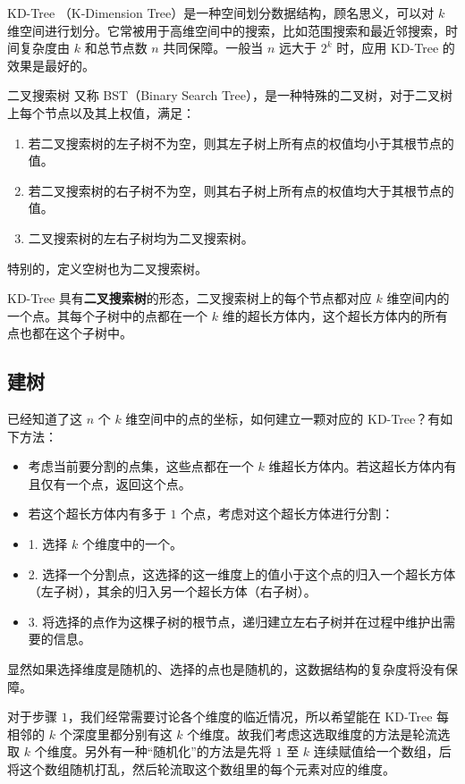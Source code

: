 
KD-Tree （K-Dimension Tree）是一种空间划分数据结构，顾名思义，可以对 $k$ 维空间进行划分。它常被用于高维空间中的搜索，比如范围搜索和最近邻搜索，时间复杂度由 $k$ 和总节点数 $n$ 共同保障。一般当 $n$ 远大于 $2^k$ 时，应用 KD-Tree 的效果是最好的。

\begin{definition}{二叉搜索树}
又称 BST（Binary Search Tree），是一种特殊的二叉树，对于二叉树上每个节点以及其上权值，满足：
\begin{enumerate}
\item 若二叉搜索树的左子树不为空，则其左子树上所有点的权值均小于其根节点的值。
\item 若二叉搜索树的右子树不为空，则其右子树上所有点的权值均大于其根节点的值。
\item 二叉搜索树的左右子树均为二叉搜索树。
\end{enumerate}
特别的，定义空树也为二叉搜索树。
\end{definition}

KD-Tree 具有\textbf{二叉搜索树}的形态，二叉搜索树上的每个节点都对应 $k$ 维空间内的一个点。其每个子树中的点都在一个 $k$ 维的超长方体内，这个超长方体内的所有点也都在这个子树中。

\subsection{建树}

已经知道了这 $n$ 个 $k$ 维空间中的点的坐标，如何建立一颗对应的 KD-Tree？有如下方法：

\begin{itemize}
\item 考虑当前要分割的点集，这些点都在一个 $k$ 维超长方体内。若这超长方体内有且仅有一个点，返回这个点。
\item 若这个超长方体内有多于 $1$ 个点，考虑对这个超长方体进行分割：
\item 1. 选择 $k$ 个维度中的一个。
    \item 2. 选择一个分割点，这选择的这一维度上的值小于这个点的归入一个超长方体（左子树），其余的归入另一个超长方体（右子树）。
    \item 3. 将选择的点作为这棵子树的根节点，递归建立左右子树并在过程中维护出需要的信息。
\end{itemize}

显然如果选择维度是随机的、选择的点也是随机的，这数据结构的复杂度将没有保障。

对于步骤 $1$，我们经常需要讨论各个维度的临近情况，所以希望能在 KD-Tree 每相邻的 $k$ 个深度里都分别有这 $k$ 个维度。故我们考虑这选取维度的方法是轮流选取 $k$ 个维度。另外有一种“随机化”的方法是先将 $1$ 至 $k$ 连续赋值给一个数组，后将这个数组随机打乱，然后轮流取这个数组里的每个元素对应的维度。

